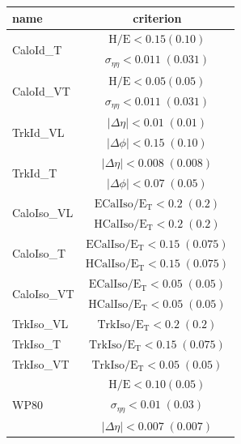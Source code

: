 %
\begin{table}[!ht]
 \centering
 \begin{tabular}{l|c}
   \hline
   name                       &  criterion \\
   \hline \hline
   \multirow{2}{*}{CaloId\_T} & $\mathrm{H/E < 0.15 (0.10) }$ \\
                               & $\sigma_{\eta\eta}\mathrm{< 0.011\;(0.031)}$ \\
    \hline
   \multirow{2}{*}{CaloId\_VT} & $\mathrm{H/E < 0.05 (0.05) }$ \\
                               & $\sigma_{\eta\eta}\mathrm{< 0.011\;(0.031)}$  \\
    \hline \hline
    \multirow{2}{*}{TrkId\_VL} & $|\Delta\eta|\mathrm{< 0.01\; (0.01)}$ \\
                               & $|\Delta\phi|\mathrm{< 0.15\;(0.10)}$  \\
    \hline
    \multirow{2}{*}{TrkId\_T} & $|\Delta\eta|\mathrm{< 0.008\; (0.008)}$ \\
                              & $|\Delta\phi|\mathrm{< 0.07\;(0.05)}$ \\
    \hline \hline
    \multirow{2}{*}{CaloIso\_VL} & $\mathrm{ECalIso/E_T <0.2\;(0.2)}$ \\
                                 & $\mathrm{HCalIso/E_T <0.2\;(0.2)}$ \\
    \hline
    \multirow{2}{*}{CaloIso\_T} & $\mathrm{ECalIso/E_T <0.15\;(0.075)}$ \\
                                 & $\mathrm{HCalIso/E_T <0.15\;(0.075)}$ \\
    \hline
    \multirow{2}{*}{CaloIso\_VT} & $\mathrm{ECalIso/E_T <0.05\;(0.05)}$ \\
                                 & $\mathrm{HCalIso/E_T <0.05\;(0.05)}$ \\
    \hline \hline
    TrkIso\_VL                   & $\mathrm{TrkIso/E_T <0.2\;(0.2)}$ \\
    \hline
    TrkIso\_T                   & $\mathrm{TrkIso/E_T <0.15\;(0.075)}$ \\
    \hline
    TrkIso\_VT                   & $\mathrm{TrkIso/E_T <0.05\;(0.05)}$ \\
    \hline \hline
    \multirow{8}{*}{WP80} 		& $\mathrm{H/E < 0.10 (0.05) }$ \\
                               	& $\sigma_{\eta\eta}\mathrm{< 0.01\;(0.03)}$ \\
    							& $|\Delta\eta|\mathrm{< 0.007\; (0.007)}$ \\

\end{tabular}
\end{table}
